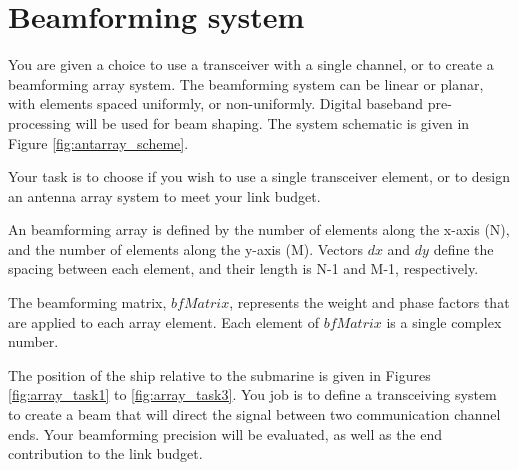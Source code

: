\section{Beamforming system}

You are given a choice to use a transceiver with a single channel, or to create a beamforming array system. The beamforming system can be linear or planar, with elements spaced uniformly, or non-uniformly. Digital baseband pre-processing will be used for beam shaping. The system schematic is given in Figure \ref{fig:antarray_scheme}.

Your task is to choose if you wish to use a single transceiver element, or to design an antenna array system to meet your link budget.

An beamforming array is defined by the number of elements along the x-axis (N), and the number of elements along the y-axis (M). Vectors $dx$ and $dy$ define the spacing between each element, and their length is N-1 and M-1, respectively.

The beamforming matrix, $bfMatrix$, represents the weight and phase factors that are applied to each array element. Each element of $bfMatrix$ is a single complex number.


The position of the ship relative to the submarine is given in Figures \ref{fig:array_task1} to \ref{fig:array_task3}. You job is to define a transceiving system to create a beam that will direct the signal between two communication channel ends. Your beamforming precision will be evaluated, as well as the end contribution to the link budget.

